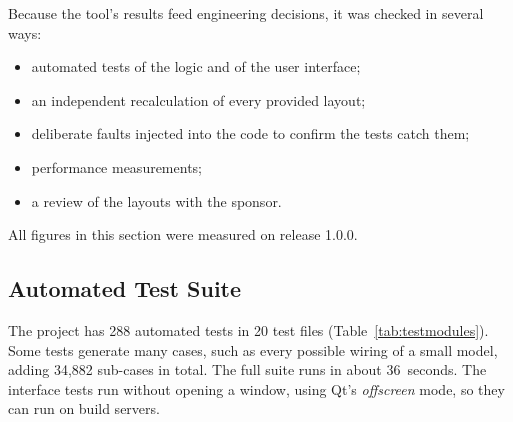 Because the tool's results feed engineering decisions, it was checked in several ways:
\begin{itemize}
  \item automated tests of the logic and of the user interface;
  \item an independent recalculation of every provided layout;
  \item deliberate faults injected into the code to confirm the tests catch them;
  \item performance measurements;
  \item a review of the layouts with the sponsor.
\end{itemize}
All figures in this section were measured on release 1.0.0.

\subsection{Automated Test Suite}

The project has 288 automated tests in 20 test files (Table~\ref{tab:testmodules}).
Some tests generate many cases, such as every possible wiring of a small model, adding
34{,}882 sub-cases in total. The full suite runs in about 36~seconds. The interface
tests run without opening a window, using Qt's \emph{offscreen} mode, so they can run
on build servers.

